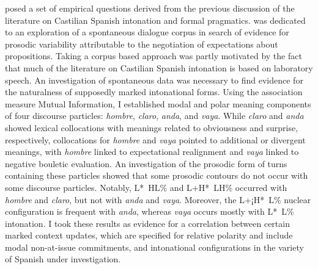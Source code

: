  posed a set of empirical questions derived from the previous discussion of the literature on Castilian Spanish intonation and formal pragmatics.  was dedicated to an exploration of a spontaneous dialogue corpus in search of evidence for prosodic variability attributable to the negotiation of expectations about propositions. Taking a corpus based approach was partly motivated by the fact that much of the literature on Castilian Spanish intonation is based on laboratory speech. An investigation of spontaneous data was necessary to find evidence for the naturalness of supposedly marked intonational forms. Using the association measure Mutual Information, I established modal and polar meaning components of four discourse particles: \textit{hombre}, \textit{claro}, \textit{anda}, and \textit{vaya}. While \textit{claro} and \textit{anda} showed lexical collocations with meanings related to obviousness and surprise, respectively, collocations for \textit{hombre} and \textit{vaya} pointed to additional or divergent meanings, with \textit{hombre} linked to expectational realignment and \textit{vaya} linked to negative bouletic evaluation. An investigation of the prosodic form of turns containing these particles showed that some prosodic contours do not occur with some discourse particles. Notably, L*~HL\% and L+H*~LH\% occurred with \textit{hombre} and \textit{claro}, but not with \textit{anda} and \textit{vaya}. Moreover, the L+¡H*~L\% nuclear configuration is frequent with \textit{anda}, whereas \textit{vaya} occurs mostly with L*~L\% intonation. I took these results as evidence for a correlation between certain marked context updates, which are specified for relative polarity and include modal non-at-issue commitments, and intonational configurations in the variety of Spanish under investigation.

